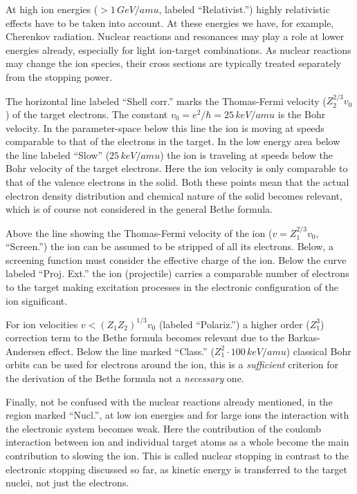 At high ion energies ($ > 1\,GeV/amu$, labeled ``Relativist.'') highly relativistic effects have to be taken into account. At these energies we have, for example, Cherenkov radiation. Nuclear reactions and resonances may play a role at lower energies already, especially for light ion-target combinations. As nuclear reactions may change the ion species, their cross sections are typically treated separately from the stopping power.

The horizontal line labeled ``Shell corr.'' marks the Thomas-Fermi velocity ($Z_2^{2/3}v_0$) of the target electrons. The constant $v_0 = e^2/\hbar = 25\,keV/amu$ is the Bohr velocity. In the parameter-space below this line the ion is moving at speeds comparable to that of the electrons in the target. In the low energy area below the line labeled ``Slow'' ($25\,keV/amu$) the ion is traveling at speeds below the Bohr velocity of the target electrons. Here the ion velocity is only comparable to that of the valence electrons in the solid. Both these points mean that the actual electron density distribution and chemical nature of the solid becomes relevant, which is of course not considered in the general Bethe formula.

Above the line showing the Thomas-Fermi velocity of the ion ($v = Z_1^{2/3}v_0$, ``Screen.'') the ion can be assumed to be stripped of all its electrons. Below, a screening function must consider the effective charge of the ion. Below the curve labeled ``Proj. Ext.'' the ion (projectile) carries a comparable number of electrons to the target making excitation processes in the electronic configuration of the ion significant.

For ion velocities $v < (Z_1Z_2)^{1/3}v_0$ (labeled ``Polariz.'') a higher order ($Z_1^3$) correction term to the Bethe formula becomes relevant due to the Barkas-Andersen effect. Below the line marked ``Class.'' ($Z_1^2\cdot 100\,keV/amu$) classical Bohr orbits can be used for electrons around the ion, this is a \emph{sufficient} criterion for the derivation of the Bethe formula not a \emph{necessary} one.

Finally, not be confused with the nuclear reactions already mentioned, in the region marked ``Nucl.'', at low ion energies and for large ions the interaction with the electronic system becomes weak. Here the contribution of the coulomb interaction between ion and individual target atoms as a whole become the main contribution to slowing the ion. This is called nuclear stopping in contrast to the electronic stopping discussed so far, as kinetic energy is transferred to the target nuclei, not just the electrons.

